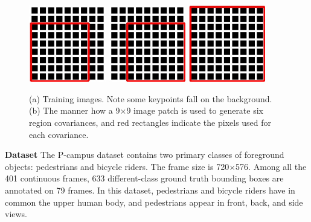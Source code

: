 \documentclass{mva2011}
\begin{document}
\begin{figure}
{{\begin{minipage}[b]{0.2\textwidth}
\includegraphics[width=0.3\textwidth,bb=0 0 149 149]{dst2.jpg}
\includegraphics[width=0.3\textwidth,bb=0 0 149 149]{dst4.jpg}
\includegraphics[width=0.3\textwidth,bb=0 0 149 149]{dst1.jpg}
\end{minipage}
}
\label{fig:train:b}
}
\caption{(a) Training images. Note some keypoints fall on the background. (b) The manner how a 9$\times$9 image patch is used to generate six region covariances, and red rectangles indicate the pixels used for each covariance.}
\label{fig:train}
\end{figure}

\textbf{Dataset} The P-campus dataset contains two primary classes of foreground objects: pedestrians and bicycle riders. The frame size is 720$\times$576. Among all the 401 continuous frames, 633 different-class ground truth bounding boxes are annotated on 79 frames. In this dataset, pedestrians and bicycle riders have in common the upper human body, and pedestrians appear in front, back, and side views.
\end{document}
